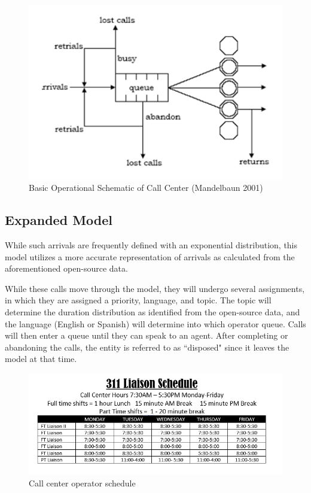 \documentclass[12pt,twocolumn]{article}
\begin{document}
	\begin{figure}[h]
	\includegraphics[scale=.45]{call_center_layout.png}
	\caption{Basic Operational Schematic of Call Center (Mandelbaun 2001)}
	\end{figure}


\subsection{Expanded Model}

While such arrivals are frequently defined with an exponential distribution, this model utilizes a more accurate representation of arrivals as calculated from the aforementioned open-source data.  

\par

While these calls move through the model, they will undergo several assignments, in which they are assigned a priority, language, and topic.  The topic will determine the duration distribution as identified from the open-source data, and the language (English or Spanish) will determine into which operator queue.  Calls will then enter a queue until they can speak to an agent.  After completing or abandoning the calls, the entity is referred to as ``disposed" since it leaves the model at that time.

	\begin{figure}[h]
	\includegraphics[scale=.35]{schedule2.jpg}
	\caption{Call center operator schedule}
	\end{figure}
\end{document}
